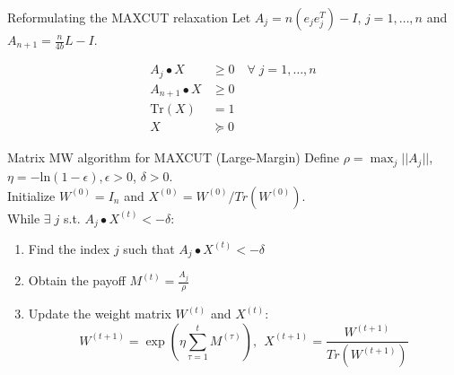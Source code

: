 \documentclass{beamer}
\begin{document}

\begin{frame}{Reformulating the MAXCUT relaxation}
Let $A_j = n(e_je_j^T) - I$, $j = 1, \dots, n$ and $A_{n+1} = \frac{n}{4b} L - I$. 

\begin{align*}
A_j \bullet X &\geq 0 \quad \forall \; j = 1,\ldots,n \\
A_{n+1} \bullet X &\geq 0 \\
\text{Tr}(X) &= 1 \\
X &\succcurlyeq 0
\end{align*}
\end{frame}


\begin{frame}{Matrix MW algorithm for MAXCUT (Large-Margin)}
Define $\rho = \max_j ||A_j||$, $\eta = -\text{ln}(1-\epsilon), \epsilon > 0$, $\delta > 0$. \\ \vspace{.5cm}
Initialize $W^{(0)} = I_n$ \quad and $X^{(0)} = W^{(0)}/Tr(W^{(0)})$. \\ \vspace{.5cm}
While $\exists \; j$ s.t. $A_j \bullet X^{(t)} < -\delta$:
\begin{enumerate}
\setlength\itemsep{1.2em}
\item Find the index $j$ such that $A_j \bullet X^{(t)} < -\delta$
\item Obtain the payoff $M^{(t)} = \frac{A_j}{\rho}$
\item Update the weight matrix $W^{(t)}$ and $X^{(t)}$:
$$ W^{(t+1)} = \exp \left(\eta \sum_{\tau =1}^t M^{(\tau)}\right) ,\ \ X^{(t+1)} = \frac{W^{(t+1)}}{Tr(W^{(t+1)})}$$

\end{enumerate}
\end{frame}
\end{document}
